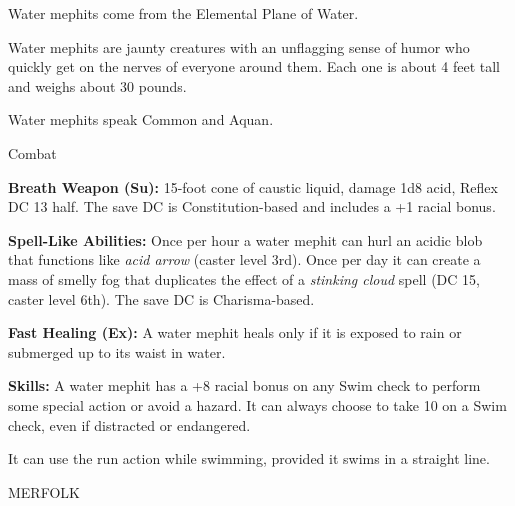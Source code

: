 \documentclass{article}
\begin{document}
Water mephits come from the Elemental Plane of Water.

Water mephits are jaunty creatures with an unflagging sense of humor who quickly 
get on the nerves of everyone around them. Each one is about 4 feet tall and weighs 
about 30 pounds.

Water mephits speak Common and Aquan.

Combat

\textbf{Breath Weapon (Su):} 15-foot cone of caustic liquid, damage 1d8 acid, Reflex 
DC 13 half. The save DC is Constitution-based and includes a +1 racial bonus.

\textbf{Spell-Like Abilities: }Once per hour a water mephit can hurl an acidic 
blob that functions like \textit{acid arrow }(caster level 3rd). Once per day it 
can create a mass of smelly fog that duplicates the effect of a \textit{stinking 
cloud }spell (DC 15, caster level 6th). The save DC is Charisma-based.

\textbf{Fast Healing (Ex): }A water mephit heals only if it is exposed to rain 
or submerged up to its waist in water.

\textbf{Skills:} A water mephit has a +8 racial bonus on any Swim check to perform 
some special action or avoid a hazard. It can always choose to take 10 on a Swim 
check, even if distracted or endangered.

It can use the run action while swimming, provided it swims in a straight line.

\vspace{12pt}
{\LARGE{}MERFOLK}
\end{document}
